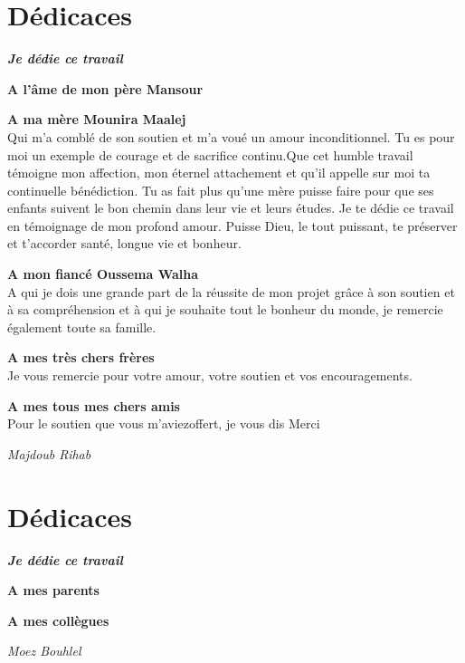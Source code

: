 \section*{Dédicaces}
\vspace{1.0in}

\begin{center}
    \slshape
    \textbf{Je dédie ce travail}

    \bigskip
    \textbf{A l'âme de mon père Mansour}

    \textbf{A ma mère Mounira Maalej} \\
    Qui m'a comblé de son soutien et m'a voué un amour inconditionnel. Tu
    es pour moi un exemple de courage et de sacrifice continu.Que cet
    humble travail témoigne mon affection, mon éternel attachement et qu'il
    appelle sur moi ta continuelle bénédiction. Tu as fait plus qu’une mère
    puisse faire pour que ses enfants suivent le bon chemin dans leur vie
    et leurs études.  Je te dédie ce travail en témoignage de mon profond
    amour. Puisse Dieu, le tout puissant, te préserver et t’accorder santé,
    longue vie et bonheur.

    \textbf{A mon fiancé Oussema Walha} \\
    A qui je dois une grande part de la réussite de mon projet grâce à son
    soutien et à sa compréhension et à qui je souhaite tout le bonheur du
    monde, je remercie également toute sa famille.

    \textbf{A mes très chers frères}  \\
    Je vous remercie pour votre amour, votre soutien et vos encouragements.

    \textbf{A mes tous mes chers amis} \\
    Pour le soutien que vous m'aviezoffert, je vous dis Merci

    \begin{flushright}
        \textit{Majdoub Rihab}
    \end{flushright}
\end{center}

\clearpage

\section*{Dédicaces}
\vspace{1.0in}

\begin{center}
    \slshape
    \textbf{Je dédie ce travail}

    \bigskip
    \textbf{A mes parents}

    \textbf{A mes collègues}

    \begin{flushright}
        \textit{Moez Bouhlel}
    \end{flushright}
\end{center}
